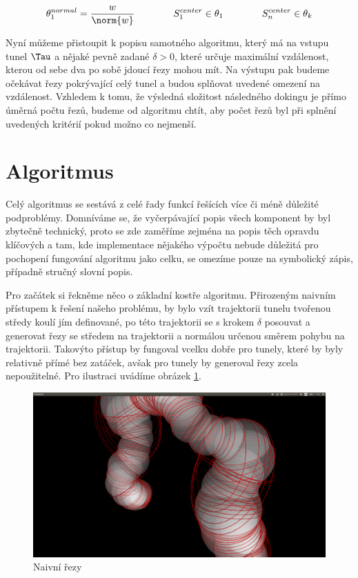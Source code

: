 \begin{align}
    \theta_1^{normal} = \frac{w}{\norm{w}}
    \qquad  \qquad S_1^{center} \in \theta_1
    \qquad  \qquad S_n^{center} \in \theta_k
    \label{cond:good_start}
\end{align}

Nyní můžeme přistoupit k popisu samotného algoritmu, který má na vstupu tunel $ \Tau $
a nějaké pevně zadané $ \delta > 0$, které určuje maximální vzdálenost, kterou
od sebe dva po sobě jdoucí řezy mohou mít. Na výstupu pak budeme očekávat řezy pokrývající
celý tunel a budou splňovat uvedené omezení na vzdálenost. Vzhledem k tomu, že výsledná
složitost následného dokingu je přímo úměrná počtu řezů, budeme od algoritmu chtít,
aby počet řezů byl při splnění uvedených kritérií pokud možno co nejmenší.


\section{Algoritmus}

Celý algoritmus se sestává z celé řady funkcí řešících více či méně důležité podproblémy.
Domníváme se, že vyčerpávající popis všech komponent by byl zbytečně technický,
proto se zde zaměříme zejména na popis těch opravdu klíčových
a tam, kde implementace nějakého výpočtu nebude důležitá pro pochopení fungování
algoritmu jako celku, se omezíme pouze na symbolický zápis, případně stručný slovní
popis.

Pro začátek si řekněme něco o základní kostře algoritmu. Přirozeným naivním přístupem
k řešení našeho problému, by bylo vzít trajektorii tunelu tvořenou středy koulí
jím definované, po této trajektorii se s krokem $ \delta $ posouvat a generovat
řezy se středem na trajektorii a normálou určenou směrem pohybu na trajektorii.
Takovýto přístup by fungoval vcelku dobře pro tunely, které by byly relativně
přímé bez zatáček, avšak pro  tunely by generoval řezy zcela nepoužitelné.
Pro ilustraci uvádíme obrázek \ref{fig:naive_cuts}.

\begin{figure}
    \centering
    \includegraphics[width=\textwidth]{img/naive_cuts.png}
    \caption{Naivní řezy}
  \centering
  \label{fig:naive_cuts}
\end{figure}

